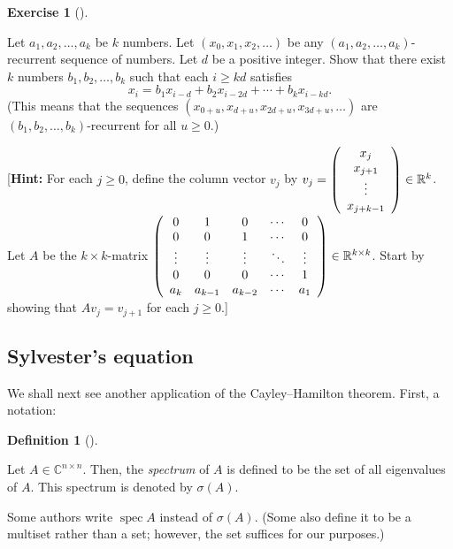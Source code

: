 \documentclass[numbers=enddot,12pt,final,onecolumn,notitlepage]{scrartcl}%
\newcounter{exer}
\numberwithin{exer}{subsection}
\theoremstyle{definition}
\newtheorem{defi}[theo]{Definition}
\newenvironment{definition}[1][]
{\begin{defi}[#1]\begin{leftbar}}
{\end{leftbar}\end{defi}}
\newtheorem{exmp}[exer]{Exercise}
\newenvironment{exercise}[1][]
{\begin{exmp}[#1]\begin{leftbar}}
{\end{leftbar}\end{exmp}}
\begin{document}
\begin{exercise}
\label{exe.schurtri.ch.lin-rec-kd} Let $a_{1},a_{2},\ldots,a_{k}$ be
$k$ numbers. Let $\left(  x_{0},x_{1},x_{2},\ldots\right)  $ be any $\left(
a_{1},a_{2},\ldots,a_{k}\right)  $-recurrent sequence of numbers. Let $d$ be a
positive integer. Show that there exist $k$ numbers $b_{1},b_{2},\ldots,b_{k}$
such that each $i\geq kd$ satisfies%
\[
x_{i}=b_{1}x_{i-d}+b_{2}x_{i-2d}+\cdots+b_{k}x_{i-kd}.
\]
(This means that the sequences $\left(  x_{0+u},x_{d+u},x_{2d+u}%
,x_{3d+u},\ldots\right)  $ are $\left(  b_{1},b_{2},\ldots,b_{k}\right)
$-recurrent for all $u\geq0$.)

[\textbf{Hint:} For each $j\geq0$, define the column vector $v_{j}$ by
$v_{j}=\left(
\begin{array}
[c]{c}%
x_{j}\\
x_{j+1}\\
\vdots\\
x_{j+k-1}%
\end{array}
\right)  \in\mathbb{R}^{k}$. Let $A$ be the $k\times k$-matrix $\left(
\begin{array}
[c]{ccccc}%
0 & 1 & 0 & \cdots & 0\\
0 & 0 & 1 & \cdots & 0\\
\vdots & \vdots & \vdots & \ddots & \vdots\\
0 & 0 & 0 & \cdots & 1\\
a_{k} & a_{k-1} & a_{k-2} & \cdots & a_{1}%
\end{array}
\right)  \in\mathbb{R}^{k\times k}$. Start by showing that $Av_{j}=v_{j+1}$
for each $j\geq0$.]
\end{exercise}

\subsection{Sylvester's equation}

We shall next see another application of the Cayley--Hamilton theorem. First,
a notation:

\begin{definition}
\label{def.schurtri.syl.spec}Let $A\in\mathbb{C}^{n\times n}$. Then, the
\emph{spectrum} of $A$ is defined to be the set of all eigenvalues of $A$.
This spectrum is denoted by $\sigma\left(  A\right)  $.
\end{definition}

Some authors write $\operatorname*{spec}A$ instead of $\sigma\left(  A\right)
$. (Some also define it to be a multiset rather than a set; however, the set
suffices for our purposes.)
\end{document}
